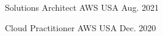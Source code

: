 

\begin{cvhonors}

  \cvhonor
    {Solutions Architect} %
    {AWS} %
    {USA} %
    {Aug. 2021} %

  \cvhonor
    {Cloud Practitioner} %
    {AWS} %
    {USA} %
    {Dec. 2020} %

\end{cvhonors}
